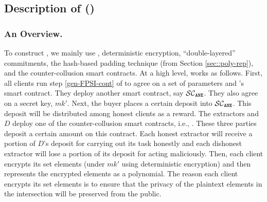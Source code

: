 



\subsection{Description of \withRew (\epsi)}



\subsubsection{An Overview.} To construct  \epsi, we mainly use \fpsi, deterministic encryption, ``double-layered'' commitments, the hash-based padding technique (from Section \ref{sec::poly-rep}), and the counter-collusion smart contracts. %
%
At a high level, \epsi works as follows. First, all clients run step \ref{gen-FPSI-cont} of \fpsi to agree on a set of parameters and \fpsi's smart contract.  They deploy another smart contract, say $\mathcal{SC}_{\mathtt{ANE}}$. They also agree on a secret key, $mk'$. Next, the buyer places a certain deposit into $\mathcal{SC}_{\mathtt{ANE}}$. This deposit will be distributed among honest clients as a reward. 
%
%
The extractors and $D$ deploy one of the counter-collusion smart contracts, i.e., \SCpc. These three parties deposit a certain amount on this contract.  Each honest extractor will receive a portion of $D$'s deposit for carrying out its task honestly and each dishonest extractor will lose a portion of its deposit for acting maliciously. 
%
Then, each client encrypts its set elements (under $mk'$ using deterministic encryption) and then represents the encrypted elements as a polynomial. The reason each client encrypts its set elements is to ensure that the privacy of the plaintext elements in the intersection will be preserved from the public. 








